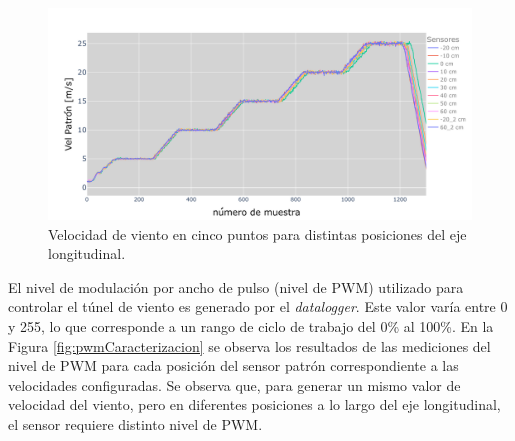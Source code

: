 \begin{figure}[H]
    \centering
    \includegraphics[width=0.95\linewidth]{Figuras/resultados/caracterizacion/velocidadViento.png}
    \caption{Velocidad de viento en cinco puntos para distintas posiciones del eje longitudinal.}
    \label{fig:velocidadViento}
\end{figure}


El nivel de modulación por ancho de pulso (nivel de PWM) utilizado para controlar el túnel de viento es generado por el \textit{datalogger}. Este valor varía entre 0 y 255, lo que corresponde a un rango de ciclo de trabajo del 0\% al 100\%. En la Figura \ref{fig:pwmCaracterizacion} se observa  los resultados de las mediciones del nivel de PWM para cada posición del sensor patrón correspondiente a las velocidades configuradas. Se observa que, para generar un mismo valor de velocidad del viento, pero en diferentes posiciones a lo largo del eje longitudinal, el sensor requiere distinto nivel de PWM.





